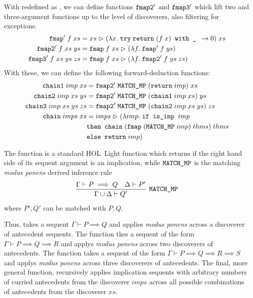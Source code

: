 With  redefined as , we can define functions $\texttt{fmap2}'$ and $\texttt{fmap3}'$ which lift two and three-argument functions up to the level of discoverers, also filtering for exceptions.
\begin{align*}
\texttt{fmap}'\;f\;xs &= xs \vartriangleright (\lambda x.\;\texttt{try}\; \texttt{return}\;(f\;x)  \texttt{ with \_ } \rightarrow 0)\;xs\\
\texttt{fmap2}'\;f\;xs\;ys &= \texttt{fmap}\;f\;xs \vartriangleright (\lambda f.\;\texttt{fmap}'\;f\;ys)\\
\texttt{fmap3}'\;f\;xs\;ys\;zs &= \texttt{fmap}\;f\;xs \vartriangleright (\lambda f.\;\texttt{fmap2}'\;f\;ys\;zs)
\end{align*}
With these, we can define the following forward-deduction functions:
\begin{align*}
\texttt{chain1}\;imp\;xs &= \texttt{fmap2}'\; \texttt{MATCH\_MP}\; (\texttt{return}\;imp)\;xs \\
\texttt{chain2}\;imp\;xs\;ys &= \texttt{fmap2}'\; \texttt{MATCH\_MP}\; (\texttt{chain1}\; imp\;xs)\;ys\\
\texttt{chain3}\;imp\;xs\;ys\;zs &= \texttt{fmap2}'\; \texttt{MATCH\_MP}\; (\texttt{chain2}\;imp\;xs\;ys)\;zs\\
\texttt{chain}\;imps\;xs &= imps \vartriangleright (\lambda imp.\;\texttt{if is\_imp } imp\\ &\texttt{then } \texttt{chain}\;(\texttt{fmap}\;(\texttt{MATCH\_MP}\;imp)\;thms)\;thms\\
&\texttt{else } \texttt{return}\; imp)
\end{align*}

The function  is a standard HOL~Light function which returns  if the right hand side of its sequent argument is an implication, while $\texttt{MATCH\_MP}$ is the matching \emph{modus ponens} derived inference rule
\begin{displaymath}\infer[\code{MATCH\_MP}]{\Gamma\cup\Delta \vdash Q'}{\Gamma \vdash P \implies Q&\Delta \vdash P'}
\end{displaymath}
where $P',Q'$ can be matched with $P,Q$. 

Thus,  takes a sequent $\Gamma \vdash P \implies Q$ and applies \emph{modus ponens} across a discoverer of antecedent sequents. The function  tkes a sequent of the form $\Gamma \vdash P \implies Q \implies R$ and applys \emph{modus ponens} across two discoverers of antecedents. The function  takes a sequent of the form $\Gamma \vdash P \implies Q \implies R \implies S$ and applys \emph{modus ponens} across three discoverers of antecedents. The final, more general  function, recursively applies implication sequents with arbitrary numbers of curried antecedents from the discoverer $imps$ across all possible combinations of antecedents from the discoverer $xs$.%

